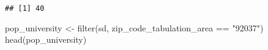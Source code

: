 \documentclass[
]{article}
\newenvironment{Shaded}{\begin{snugshade}}{\end{snugshade}}
\newcommand{\DecValTok}[1]{\textcolor[rgb]{0.00,0.00,0.81}{#1}}
\newcommand{\FloatTok}[1]{\textcolor[rgb]{0.00,0.00,0.81}{#1}}
\newcommand{\FunctionTok}[1]{\textcolor[rgb]{0.00,0.00,0.00}{#1}}
\newcommand{\NormalTok}[1]{#1}
\newcommand{\OtherTok}[1]{\textcolor[rgb]{0.56,0.35,0.01}{#1}}
\newcommand{\SpecialCharTok}[1]{\textcolor[rgb]{0.00,0.00,0.00}{#1}}
\newcommand{\StringTok}[1]{\textcolor[rgb]{0.31,0.60,0.02}{#1}}
\begin{document}
\begin{Shaded}
\end{Shaded}

\begin{verbatim}
## [1] 40
\end{verbatim}

\begin{Shaded}
\begin{Highlighting}[]
\NormalTok{pop\_university }\OtherTok{\textless{}{-}} \FunctionTok{filter}\NormalTok{(sd, zip\_code\_tabulation\_area }\SpecialCharTok{==} \StringTok{"92037"}\NormalTok{)}
\FunctionTok{head}\NormalTok{(pop\_university)}
\end{Highlighting}
\end{Shaded}
\end{document}
